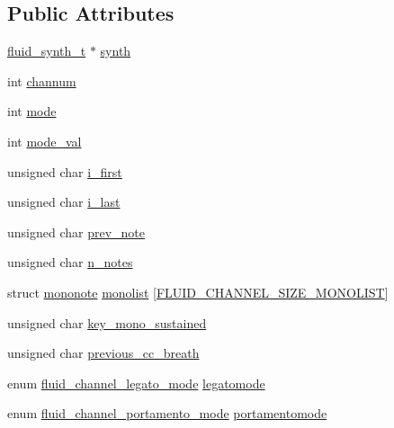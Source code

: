 \subsection*{Public Attributes}
\begin{DoxyCompactItemize}
\item 
\hyperlink{types_8h_ae265f10ae174a13afe010de50d87e1a4}{fluid\+\_\+synth\+\_\+t} $\ast$ \hyperlink{struct__fluid__channel__t_afca755478ea82a7e7156827a2e94d7ce}{synth}
\item 
int \hyperlink{struct__fluid__channel__t_a199ffbf3439801856015686f479d5fe8}{channum}
\item 
int \hyperlink{struct__fluid__channel__t_a36a6f28ca6b9e1e842cf09c2f97ec678}{mode}
\item 
int \hyperlink{struct__fluid__channel__t_ae0ed93ab4611d447773cda2b810a2353}{mode\+\_\+val}
\item 
unsigned char \hyperlink{struct__fluid__channel__t_a15ff2c0965bff5c544a38ec71349d5b5}{i\+\_\+first}
\item 
unsigned char \hyperlink{struct__fluid__channel__t_ad1de61573963862a0c0c6080daef0841}{i\+\_\+last}
\item 
unsigned char \hyperlink{struct__fluid__channel__t_a634b4d0d17c3a5aa6c0c4ed2d9b293e4}{prev\+\_\+note}
\item 
unsigned char \hyperlink{struct__fluid__channel__t_a3b89d8a1bb0ad6e50c9a7b7dbf213065}{n\+\_\+notes}
\item 
struct \hyperlink{structmononote}{mononote} \hyperlink{struct__fluid__channel__t_ad9229dcdb7c4812d858494af3fb2b22a}{monolist} \mbox{[}\hyperlink{fluid__chan_8h_ab28236e45aef5e98c5f75a157ab5d2c4}{F\+L\+U\+I\+D\+\_\+\+C\+H\+A\+N\+N\+E\+L\+\_\+\+S\+I\+Z\+E\+\_\+\+M\+O\+N\+O\+L\+I\+ST}\mbox{]}
\item 
unsigned char \hyperlink{struct__fluid__channel__t_a18c3e3e454963634c8668038f94026a8}{key\+\_\+mono\+\_\+sustained}
\item 
unsigned char \hyperlink{struct__fluid__channel__t_a513731952b4338bc426ac009e6e908a7}{previous\+\_\+cc\+\_\+breath}
\item 
enum \hyperlink{synth_8h_aafd94b0fb1fa9d98841bed11d8418c3a}{fluid\+\_\+channel\+\_\+legato\+\_\+mode} \hyperlink{struct__fluid__channel__t_a3ce58c6ab9a89850f404d90ad402757d}{legatomode}
\item 
enum \hyperlink{synth_8h_a073e69327108f3c7c6feb24c2ca4d3f6}{fluid\+\_\+channel\+\_\+portamento\+\_\+mode} \hyperlink{struct__fluid__channel__t_af74370b1165a26dd277a6ded58579326}{portamentomode}
\item 

\end{DoxyCompactItemize}
